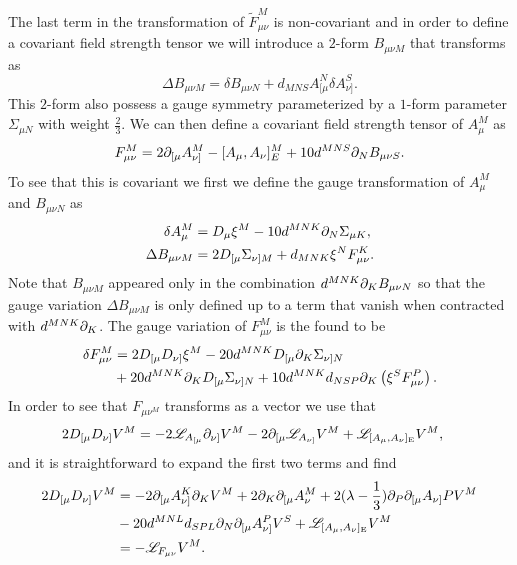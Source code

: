 The last term in the transformation of $\tilde{F}^M_{\mu\nu}$ is non-covariant and in order to define a covariant field strength tensor we will introduce a $2$-form $B_{\mu\nu M}$ that transforms as 
\begin{equation}
    \Delta B_{\mu\nu M} = \delta B_{\mu\nu N}+d_{MNS}A^N_{[\mu}\delta A^S_{\nu]}.
\end{equation}
This $2$-form also possess a gauge symmetry parameterized by a $1$-form parameter $\Sigma_{\mu N}$ with weight $\frac{2}{3}$. We can then define a covariant field strength tensor of $A^M_\mu$ as 
\begin{equation}
    F_{\mu\nu}^M = 2\partial_{[\mu}A_{\nu]}^M-[A_\mu,A_\nu]_E^M+10d^{MNS}\partial_NB_{\mu\nu S}.
\end{equation}
To see that this is covariant we first we define the gauge transformation of $A_\mu^M$ and $B_{\mu\nu N}$ as 
\begin{equation}
    \begin{aligned}
    \delta A_\mu^M &= D_\mu\xi^M-10d^{MNK}\partial_N\Sigma_{\mu K},\\
    \Delta B_{\mu\nu M} &= 2D_{[\mu}\Sigma_{\nu]M}+d_{MNK}\xi^NF_{\mu\nu}^K.
    \end{aligned}
\end{equation}
Note that $B_{\mu\nu M}$ appeared only in the combination $d^{MNK}\partial_KB_{\mu\nu N}$ so that the gauge variation $\Delta B_{\mu\nu M}$ is only defined up to a term that vanish when contracted with $d^{MNK}\partial_K$. The gauge variation of $F_{\mu\nu}^M$ is the found to be
\begin{equation}\label{eq:GaugeVariationE6}
    \begin{aligned}
        \delta F_{\mu\nu}^M &= 2D_{[\mu}D_{\nu]}\xi^M-20d^{MNK}D_{[\mu}\partial_K\Sigma_{\nu]N}\\
        &+20d^{MNK}\partial_KD_{[\mu}\Sigma_{\nu]N}+10d^{MNK}d_{NSP}\partial_K\left(\xi^SF_{\mu\nu}^P\right).
    \end{aligned}
\end{equation}
In order to see that $F_{\mu\nu^M}$ transforms as a vector we use that 
\begin{equation}
    \begin{aligned}
    2D_{[\mu}D_{\nu]}V^M &=-2\mathscr{L}_{A_{[\mu}}\partial_{\nu]}V^M-2\partial_{[\mu}\mathscr{L}_{A_{\nu]}}V^M+\mathscr{L}_{[A_\mu,A_\nu]_{\text{E}}}V^M,
    \end{aligned}
\end{equation}
and it is straightforward to expand the first two terms and find 
\begin{equation}\label{eq:E6FMUNUCOMM}
    \begin{aligned}
        2D_{[\mu}D_{\nu]}V^M &= -2\partial_{[\mu} A_{\nu]}^K\partial_KV^M+2\partial_K\partial_{[\mu}A_{\nu}^M+2(\lambda-\frac{1}{3})\partial_P\partial_{[\mu}A_{\nu]}PV^M\\
        &-20d^{MNL}d_{SPL}\partial_N\partial_{[\mu}A_{\nu]}^PV^S+\mathscr{L}_{[A_\mu,A_\nu]_{\text{E}}}V^M\\
        &= -\mathscr{L}_{F_{\mu\nu}}V^M.
    \end{aligned}
\end{equation}
